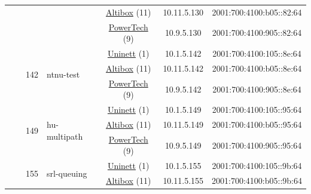 \begin{small}
\begin{center}
\begin{longtable}{|c|c|c|c|c|c|c|c|}
  &  &  &  & \multicolumn{2}{|c|}{\tiny{\href{https://www.altibox.no}{Altibox} (11)}} & \tiny{10.11.5.130} & \tiny{2001:700:4100:b05::82:64} \\* \cline{5-5}\cline{6-6}\cline{7-7}\cline{8-8}
  &  &  &  & \multicolumn{2}{|c|}{\tiny{\href{http://www.powertech.no}{PowerTech} (9)}} & \tiny{10.9.5.130} & \tiny{2001:700:4100:905::82:64} \\* \cline{3-3}\cline{4-4}\cline{5-5}\cline{6-6}\cline{7-7}\cline{8-8}
  &  & \multirow{3}{*}{\tiny{142}} & \multicolumn{1}{|l|}{\multirow{3}{*}{\tiny{ntnu-test}}} & \multicolumn{2}{|c|}{\tiny{\href{https://www.uninett.no}{Uninett} (1)}} & \tiny{10.1.5.142} & \tiny{2001:700:4100:105::8e:64} \\* \cline{5-5}\cline{6-6}\cline{7-7}\cline{8-8}
  &  &  &  & \multicolumn{2}{|c|}{\tiny{\href{https://www.altibox.no}{Altibox} (11)}} & \tiny{10.11.5.142} & \tiny{2001:700:4100:b05::8e:64} \\* \cline{5-5}\cline{6-6}\cline{7-7}\cline{8-8}
  &  &  &  & \multicolumn{2}{|c|}{\tiny{\href{http://www.powertech.no}{PowerTech} (9)}} & \tiny{10.9.5.142} & \tiny{2001:700:4100:905::8e:64} \\* \cline{3-3}\cline{4-4}\cline{5-5}\cline{6-6}\cline{7-7}\cline{8-8}
  &  & \multirow{3}{*}{\tiny{149}} & \multicolumn{1}{|l|}{\multirow{3}{*}{\tiny{hu-multipath}}} & \multicolumn{2}{|c|}{\tiny{\href{https://www.uninett.no}{Uninett} (1)}} & \tiny{10.1.5.149} & \tiny{2001:700:4100:105::95:64} \\* \cline{5-5}\cline{6-6}\cline{7-7}\cline{8-8}
  &  &  &  & \multicolumn{2}{|c|}{\tiny{\href{https://www.altibox.no}{Altibox} (11)}} & \tiny{10.11.5.149} & \tiny{2001:700:4100:b05::95:64} \\* \cline{5-5}\cline{6-6}\cline{7-7}\cline{8-8}
  &  &  &  & \multicolumn{2}{|c|}{\tiny{\href{http://www.powertech.no}{PowerTech} (9)}} & \tiny{10.9.5.149} & \tiny{2001:700:4100:905::95:64} \\* \cline{3-3}\cline{4-4}\cline{5-5}\cline{6-6}\cline{7-7}\cline{8-8}
  &  & \multirow{3}{*}{\tiny{155}} & \multicolumn{1}{|l|}{\multirow{3}{*}{\tiny{srl-queuing}}} & \multicolumn{2}{|c|}{\tiny{\href{https://www.uninett.no}{Uninett} (1)}} & \tiny{10.1.5.155} & \tiny{2001:700:4100:105::9b:64} \\* \cline{5-5}\cline{6-6}\cline{7-7}\cline{8-8}
  &  &  &  & \multicolumn{2}{|c|}{\tiny{\href{https://www.altibox.no}{Altibox} (11)}} & \tiny{10.11.5.155} & \tiny{2001:700:4100:b05::9b:64} \\* \cline{5-5}\cline{6-6}\cline{7-7}\cline{8-8}

\end{longtable}
\end{center}
\end{small}
